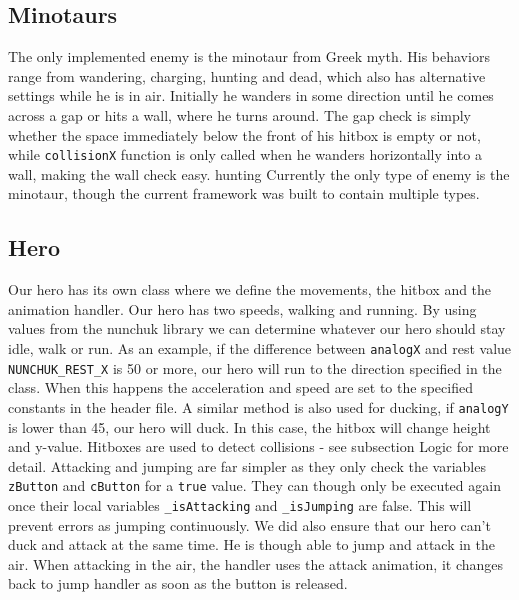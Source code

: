 \subsection*{Minotaurs} %
The only implemented enemy is the minotaur from Greek myth. His behaviors range from wandering, charging, hunting and dead, which also has alternative settings while he is in air. Initially he wanders in some direction until he comes across a gap or hits a wall, where he turns around. The gap check is simply whether the space immediately below the front of his hitbox is empty or not, while {\tt collisionX} function is only called when he wanders horizontally into a wall, making the wall check easy.
hunting
\newline
Currently the only type of enemy is the minotaur, though the current framework was built to contain multiple types.

\subsection*{Hero}
Our hero has its own class where we define the movements, the hitbox and
the animation handler.
\newline
Our hero has two speeds, walking and running. By using values from the nunchuk library we can determine whatever our hero should stay idle, walk or run. As an example, if the difference between {\tt analogX} and rest value {\tt NUNCHUK\_REST\_X} is 50 or more, our hero will run to the direction specified in the class. When this happens the acceleration and speed are set to the specified constants in the header file.  A similar method is also used for ducking, if {\tt analogY} is lower than 45, our hero will duck. In this case, the hitbox will change height and y-value. Hitboxes are used to detect collisions - see subsection Logic for more detail.
\newline
Attacking and jumping are far simpler as they only check the variables {\tt zButton} and {\tt cButton} for a {\tt true} value. They can though only be executed again once their local variables {\tt \_isAttacking} and {\tt \_isJumping} are false. This will prevent errors as jumping continuously. We did also ensure that our hero can't duck and attack at the same time. He is though able to jump and attack in the air. When attacking in the air, the handler uses the attack animation, it changes back to jump handler as soon as the button is released.


